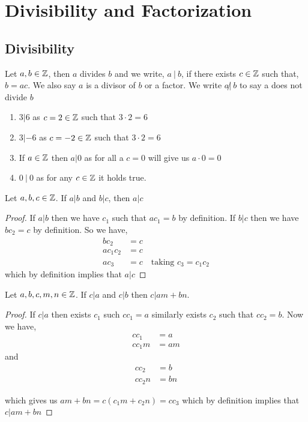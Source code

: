 \chapter{Divisibility and Factorization}

\section{Divisibility}

\begin{definition}[Divisibility]
Let $a, b \in \mathbb{Z}$, then $a$ divides  $b$ and we write, $a \: |  \: b$, if there exists $c \in \mathbb{Z}$ such that,  $ b = ac $. We also say $a$ is a divisor of $b$ or a factor. We write  $a \not | \: b$ to say a does not divide  $b$
\end{definition}
\begin{eg}
    \begin{enumerate}
    \item $3 | 6$ as  $c = 2 \in \mathbb{Z}$ such that  $3 \cdot 2 = 6$
    \item $3 | -6$ as  $c = -2 \in \mathbb{Z}$ such that  $3 \cdot 2 = 6$
    \item If $a \in \mathbb{Z}$ then  $a | 0$ as for all a $c = 0$ will give us $a \cdot 0 = 0$
    \item $0 \: | \: 0$ as for  any $c \in \mathbb{Z}$ it holds true.
    \end{enumerate}
\end{eg}

\begin{prop}
    Let $a, b ,c \in \mathbb{Z}$. If  $a | b$ and  $b | c$, then  $a | c$
\end{prop}
\begin{proof}
   If $a | b$  then we have $c_1$ such that $a c_1 = b$ by definition. If  $ b | c$ then we have  $ b c_2 = c$ by definition. So we have, 
   \begin{align*}
       bc_2&= c\\
       ac_1c_2 &= c\\
       ac_3 &= c \quad \text{taking $c_3 = c_1c_2$}
   \end{align*}
   which by definition implies that $a | c$
\end{proof}


\begin{prop}
    Let $a, b , c, m ,n \in \mathbb{Z}$. If  $ c | a$ and  $c | b$ then  $c | am + bn$.
\end{prop}
\begin{proof}
    If $c | a$ then exists $ c_1 $ such $c c_1  = a$ similarly exists $c_2$ such that $cc_2 = b$. Now we have, 
    \begin{align*}
        cc_1 &= a\\
        cc_1m &= am
    \end{align*}
    and
    \begin{align*}
        cc_2 &= b\\
        cc_2n &= bn
    \end{align*}

    which gives us $am + bn = c(c_1m + c_2n) = cc_3$ which by definition implies that $c  | am + bn$
\end{proof}

